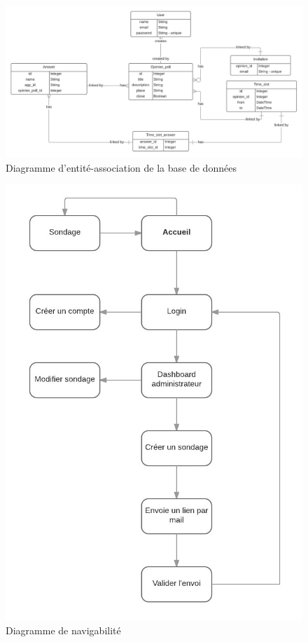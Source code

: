 \documentclass[titlepage]{report}
\begin{document}
\begin{figure}[h]
	\caption{Diagramme d'entité-association de la base de données}
	\label{annexe_diagramme_entiteAssociation}
	\centering
	\includegraphics[width=\textwidth]{figures/diagrammes/entiteAssociation.png}
\end{figure}

\begin{figure}[h]
	\caption{Diagramme de navigabilité}
	\label{annexe_diagramme_navigabilite}
	\centering
	\includegraphics[scale=1]{figures/diagrammes/navigabilite.png}
\end{figure}
\end{document}

